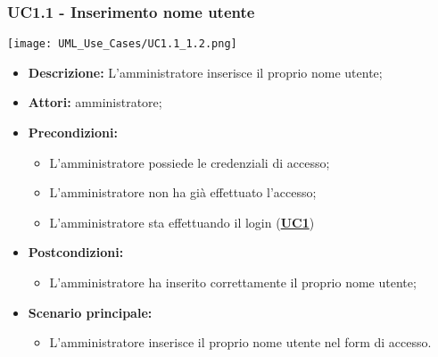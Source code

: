 \subsubsection{UC1.1 - Inserimento nome utente}
\label{sec:UC1.1}
\texttt{[image: UML\_Use\_Cases/UC1.1\_1.2.png]}
\begin{itemize}
	\item \textbf{Descrizione:} L’amministratore inserisce il proprio nome utente;
	\item \textbf{Attori:} amministratore;
	\item \textbf{Precondizioni:} 
	\begin{itemize}
		\item L’amministratore possiede le credenziali di accesso;
		\item L’amministratore non ha già effettuato l’accesso;
		\item L’amministratore sta effettuando il login (\hyperref[sec:UC1]{\textbf{UC1}})
	\end{itemize}
	\item \textbf{Postcondizioni:} 
	\begin{itemize}
		\item L’amministratore ha inserito correttamente il proprio nome utente;
	\end{itemize}
	\item \textbf{Scenario principale:} 
	\begin{itemize}
		\item L’amministratore inserisce il proprio nome utente nel form di accesso.
	\end{itemize}
\end{itemize}


